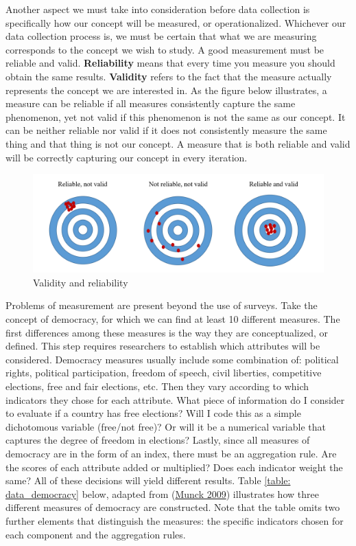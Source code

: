 \documentclass{book}
\begin{document}
Another aspect we must take into consideration before data collection is
specifically how our concept will be measured, or operationalized. Whichever
our data collection process is, we must be certain that what we are measuring
corresponds to the concept we wish to study. A good measurement must be
reliable and valid. \textbf{Reliability} means that every time you measure you
should obtain the same results. \textbf{Validity} refers to the fact that the
measure actually represents the concept we are interested in. As the figure
below illustrates, a measure can be reliable if all measures consistently
capture the same phenomenon, yet not valid if this phenomenon is not the same
as our concept. It can be neither reliable nor valid if it does not
consistently measure the same thing and that thing is not our concept. A
measure that is both reliable and valid will be correctly capturing our
concept in every iteration.

\begin{figure}
\hypertarget{fig:target}{%
\centering
\includegraphics{images/data/target.png}
\caption{Validity and reliability}\label{fig:target}
}
\end{figure}

Problems of measurement are present beyond the use of surveys. Take the
concept of democracy, for which we can find at least 10 different measures.
The first differences among these measures is the way they are conceptualized,
or defined. This step requires researchers to establish which attributes will
be considered. Democracy measures usually include some combination of:
political rights, political participation, freedom of speech, civil liberties,
competitive elections, free and fair elections, etc. Then they vary according
to which indicators they chose for each attribute. What piece of information
do I consider to evaluate if a country has free elections? Will I code this as
a simple dichotomous variable (free/not free)? Or will it be a numerical
variable that captures the degree of freedom in elections? Lastly, since all
measures of democracy are in the form of an index, there must be an
aggregation rule. Are the scores of each attribute added or multiplied? Does
each indicator weight the same? All of these decisions will yield different
results. Table \protect\hyperlink{table:ux5cux2520data_democracy}{{[}table:
data\_democracy{]}} below, adapted from
(\protect\hyperlink{ref-munck2009}{Munck 2009}) illustrates how three
different measures of democracy are constructed. Note that the table omits two
further elements that distinguish the measures: the specific indicators chosen
for each component and the aggregation rules.
\end{document}
